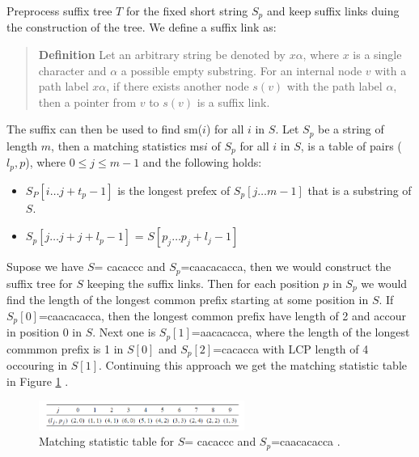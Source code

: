\documentclass[12pt]{article} %
\begin{document}
Preprocess suffix tree $T$ for the fixed short string $S_p$ and keep suffix links duing the construction of the tree. We define a suffix link as:

\begin{quote}
\textbf{Definition} 
Let an arbitrary string be denoted by $x\alpha$, where $x$ is a single character and $\alpha$ a possible empty substring. For an internal node $v$ with a path label $x\alpha$, if there exists another node $s(v)$ with the path label $\alpha$, then a pointer from $v$ to $s(v)$ is a suffix link.
\end{quote}

The suffix can then be used to find sm($i$) for all $i$ in $S$. Let $S_p$ be a string of length $m$, then a matching statistics ms$i$ of $S_p$ for all $i$ in $S$, is a table of pairs ($l_p, p$), where $0 \leq j \leq m -1$ and the following holds:
\begin{itemize}  
\item $S_P[i \ldots j + t_p-1]$ is the longest prefex of $S_p[j \ldots m -1]$ that is a substring of $S$.
\item $S_p[j \ldots j + j + l_p - 1]$ = $S[p_j \ldots p_j + l_j - 1]$
\end{itemize}

Supose we have $S$= cacaccc and $S_p$=caacacacca, then we would construct the suffix tree for $S$ keeping the suffix links. Then for each position $p$ in $S_p$ we would find the length of the longest common prefix starting at some position in $S$. If $S_p[0]$=caacacacca, then the longest common prefix have length of 2 and  accour in position 0 in $S$. Next one is $S_p[1]$=aacacacca, where the length of the longest commmon prefix is 1 in $S[0]$ and $S_p[2]$=cacacca with LCP length of 4 occouring in $S[1]$. Continuing this approach we get the matching statistic table in Figure \ref{fig:matchingstatistic} \cite{enchancedsuffix}.
\begin{figure}[H]
    \centering
    \includegraphics[width=0.6\textwidth]{matchingstatistic}
    \captionsetup{width=0.8
    \textwidth}
    \caption{Matching statistic table for $S$= cacaccc and $S_p$=caacacacca \cite{enchancedsuffix}.}
    \label{fig:matchingstatistic}
\end{figure}
\end{document}
